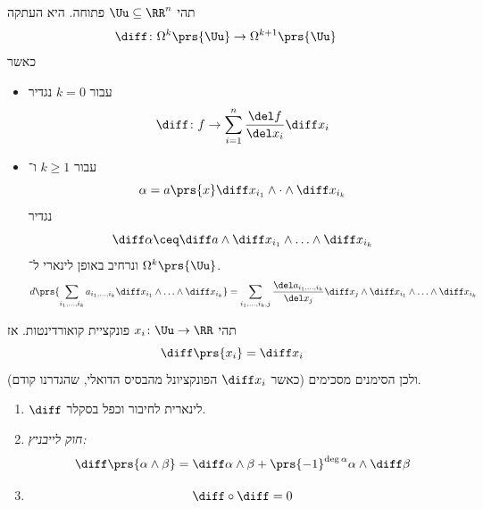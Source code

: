 \documentclass[a4paper,10pt,twoside,openany]{book}
\begin{document}
\begin{definition}
תהי
$\Uu \subseteq \RR^n$
פתוחה.
היא העתקה
\begin{align*}
\diff \colon \Omega^k\prs{\Uu} &\to \Omega^{k+1}\prs{\Uu}
\end{align*}
כאשר
\begin{itemize}
\item
עבור
$k=0$
נגדיר
\[\diff \colon f \to \sum_{i=1}^n \frac{\del f}{\del x_i} \diff x_i\]
\item
עבור
$k \geq 1$
ו־%
\[\alpha = a\prs{x} \diff x_{i_1} \wedge \cdot \wedge \diff x_{i_k}\]
נגדיר
\[\diff \alpha \ceq \diff a \wedge \diff x_{i_1} \wedge \ldots \wedge \diff x_{i_k}\]
ונרחיב באופן לינארי ל־%
$\Omega^k\prs{\Uu}$.
\begin{align*}
d\prs{\sum_{i_1, \ldots, i_k} a_{i_1, \ldots, i_k} \diff x_{i_1} \wedge \ldots \wedge \diff x_{i_k}} = \sum_{i_1, \ldots, i_k, j} \frac{\del a_{i_1, \ldots, i_k}}{\del x_j} \diff x_j \wedge \diff x_{i_1} \wedge \ldots \wedge \diff x_{i_k}
\end{align*}
\end{itemize}
\end{definition}
\begin{remark}
תהי
$x_i \colon \Uu \to \RR$
פונקציית קואורדינטות. אז
\[\diff \prs{x_i} = \diff x_i\]
(כאשר
$\diff x_i$
הפונקציונל מהבסיס הדואלי, שהגדרנו קודם) ולכן הסימנים מסכימים.
\end{remark}

\begin{proposition}
\begin{enumerate}
\item $\diff$
לינארית לחיבור וכפל בסקלר.

\item \emph{חוק לייבניץ:}
\[\diff\prs{\alpha \wedge \beta} = \diff \alpha\wedge \beta + \prs{-1}^{\deg \alpha} \alpha \wedge \diff \beta\]

\item \[\diff \circ \diff = 0\]
\end{enumerate}
\end{proposition}
\end{document}
